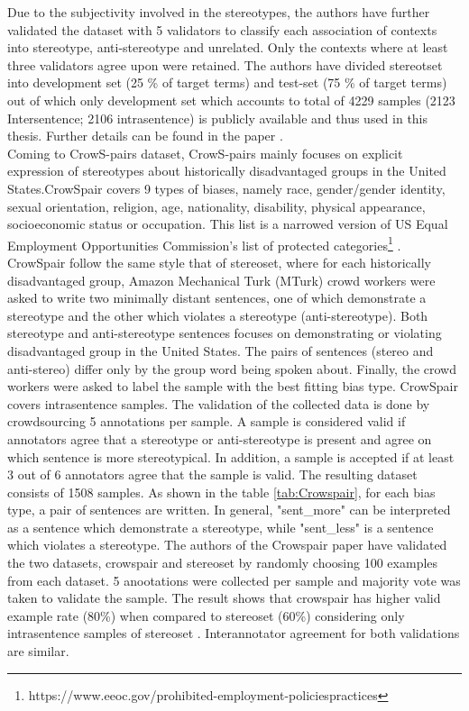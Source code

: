 Due to the subjectivity involved in the stereotypes, the authors have further validated the dataset with 5 validators to classify each association of contexts into stereotype, anti-stereotype and unrelated. Only the contexts where at least three validators agree upon were retained. The authors have divided stereotset into development set (25 \% of target terms) and test-set (75 \% of target terms) out of which only development set which accounts to total of 4229 samples (2123 Intersentence; 2106 intrasentence) is publicly available and thus used in this thesis. Further details can be found in the paper \cite{nadeem2020stereoset}.
\\

Coming to CrowS-pairs \cite{nangia2020crows} dataset, CrowS-pairs mainly focuses on explicit expression of stereotypes about historically disadvantaged groups in the United States.CrowSpair covers 9 types of biases, namely race, gender/gender identity, sexual orientation, religion, age, nationality, disability, physical appearance, socioeconomic status or occupation. This list is a narrowed version of US Equal Employment Opportunities Commission's list of protected categories\footnote{https://www.eeoc.gov/prohibited-employment-policiespractices} \cite{nangia2020crows}. CrowSpair follow the same style that of stereoset\cite{nadeem2020stereoset}, where for each historically disadvantaged group, Amazon Mechanical Turk (MTurk) crowd workers were asked to write two minimally distant sentences, one of which demonstrate a stereotype and the other which violates a stereotype (anti-stereotype). Both stereotype and anti-stereotype sentences focuses on demonstrating or violating disadvantaged group in the United States. The pairs of sentences (stereo and anti-stereo) differ only by the group word being spoken about. Finally, the crowd workers were asked to label the sample with the best fitting bias type. CrowSpair covers intrasentence samples. The validation of the collected data is done by crowdsourcing 5 annotations per sample. A sample is considered valid if annotators agree that a stereotype or anti-stereotype is
present and agree on which sentence is more stereotypical\cite{nangia2020crows}. In addition, a sample is accepted if at least 3 out of 6 annotators agree that the sample is valid. The resulting dataset consists of 1508 samples. As shown in the table \ref{tab:Crowspair}, for each bias type, a pair of sentences are written. In general, "sent\_more" can be interpreted as a sentence which demonstrate a stereotype, while "sent\_less" is a sentence which violates a stereotype. The authors of the Crowspair paper have validated the two datasets, crowspair and stereoset by randomly choosing 100 examples from each dataset. 5 anootations were collected per sample  and majority vote was taken to validate the sample. The result shows that crowspair has higher valid example rate (80\%) when compared to stereoset (60\%) considering only intrasentence samples of stereoset \cite{nangia2020crows}. Interannotator agreement for both validations are similar.
\\

